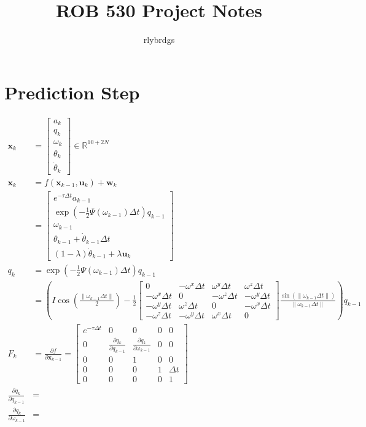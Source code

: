 \documentclass[11pt]{article}
\title{ROB 530 Project Notes}
\author{rlybrdgs }
\newcommand{\pd}[2]{\frac{\partial #1}{\partial #2}} %
\begin{document}
\maketitle
\section{Prediction Step}
\begin{align*}
    \mathbf{x}_k &= \begin{bmatrix}
        a_k \\ q_k \\ \omega_k \\ \theta_k \\ \dot{\theta}_k
    \end{bmatrix} \in \mathbb{R}^{10+2N} \\
    \mathbf{x}_k &= f(\mathbf{x}_{k-1}, \mathbf{u}_k) + \mathbf{w}_k \\
    &= \begin{bmatrix}
        e^{-\tau \Delta t} a_{k-1} \\
        \exp\left(-\frac{1}{2} \Psi(\omega_{k-1}) \Delta t\right) q_{k-1} \\
        \omega_{k-1} \\
        \theta_{k-1} + \dot{\theta}_{k-1} \Delta t \\
        (1 - \lambda) \dot{\theta}_{k-1} + \lambda \mathbf{u}_k
    \end{bmatrix} \\
    q_k &= \exp\left(-\frac{1}{2} \Psi(\omega_{k-1}) \Delta t\right) q_{k-1} \\
    &= \left(I \cos\left(\frac{\|\omega_{k-1} \Delta t\|}{2}\right) - \frac{1}{2} \begin{bmatrix}
        0 & -\omega^x \Delta t & \omega^y \Delta t & \omega^z \Delta t \\
        -\omega^x \Delta t & 0 & -\omega^z \Delta t & -\omega^y \Delta t \\
        -\omega^y \Delta t & \omega^z \Delta t & 0 & -\omega^x \Delta t \\
        -\omega^z \Delta t & -\omega^y \Delta t & \omega^x \Delta t & 0
    \end{bmatrix} \frac{\sin\left(\|\omega_{k-1} \Delta t\|\right)}{\|\omega_{k-1} \Delta t\|}\right) q_{k-1} \\
    F_k &= \pd{f}{\mathbf{x}_{k-1}} = \begin{bmatrix}
        e^{-\tau \Delta t} & 0 & 0 & 0 & 0 \\
        0 & \pd{q_k}{q_{k-1}} & \pd{q_k}{\omega_{k-1}} & 0 & 0 \\
        0 & 0 & 1 & 0 & 0 \\
        0 & 0 & 0 & 1 & \Delta t \\
        0 & 0 & 0 & 0 & 1
    \end{bmatrix} \\
    \pd{q_k}{q_{k-1}} &= \\
    \pd{q_k}{\omega_{k-1}} &= \\
\end{align*}
\end{document}
